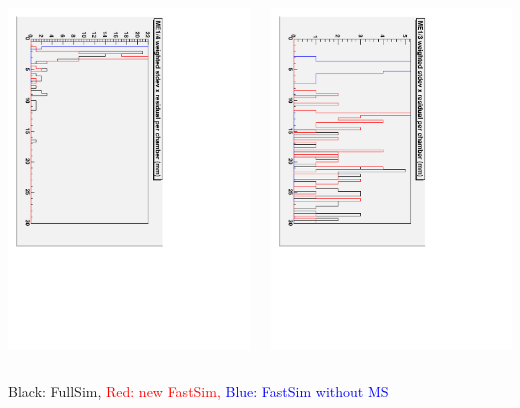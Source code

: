 \documentclass[compress]{beamer}
\begin{document}
\begin{frame}
\begin{columns}
\includegraphics[height=\linewidth, angle=90]{stdevs_me14.pdf}

\includegraphics[height=\linewidth, angle=90]{stdevs_me13.pdf}
\end{columns}

\small
Black: FullSim, \textcolor{red}{Red: new FastSim,} \textcolor{blue}{Blue: FastSim without MS}
\end{frame}
\end{document}
